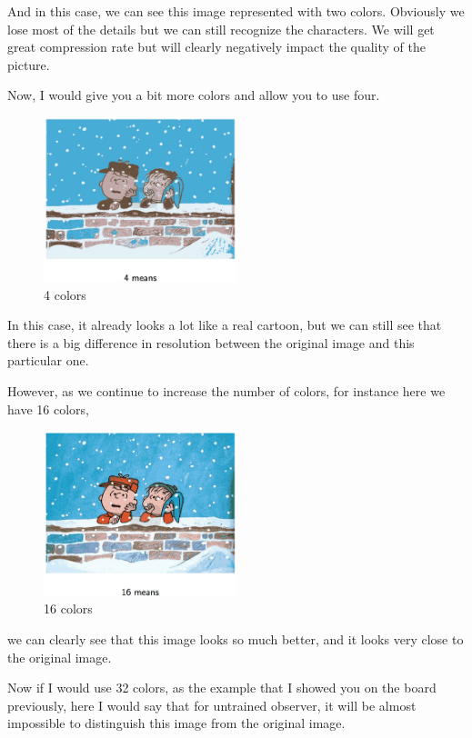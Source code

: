 \documentclass[a4paper, 12pt]{article}
\begin{document}
And in this case, we can see this image represented with two colors. Obviously
we lose most of the details but we can still recognize the characters. We will
get great compression rate but will clearly negatively impact the quality of the
picture.

Now, I would give you a bit more colors and allow you to use four.

\begin{figure}[H]
\centering
\includegraphics[width=0.5\textwidth]{./pic/cartoon-03.png}
\caption{\label{fig:org436a168}4 colors}
\end{figure}

In this case, it already looks a lot like a real cartoon, but we can still see
that there is a big difference in resolution between the original image and this
particular one.

However, as we continue to increase the number of colors, for instance here we
have 16 colors,

\begin{figure}[H]
\centering
\includegraphics[width=0.5\textwidth]{./pic/cartoon-04.png}
\caption{\label{fig:orgd4c8e45}16 colors}
\end{figure}

we can clearly see that this image looks so much better, and it looks very close
to the original image.

Now if I would use 32 colors, as the example that I showed you on the board
previously, here I would say that for untrained observer, it will be almost
impossible to distinguish this image from the original image.
\end{document}
